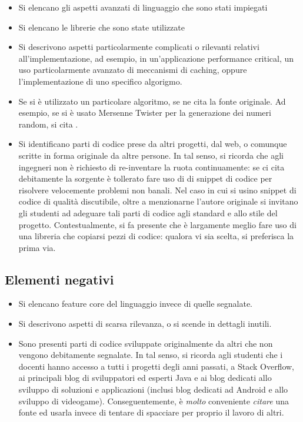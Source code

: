\documentclass[a4paper,12pt]{report}
\begin{document}
\begin{itemize}
	\item Si elencano gli aspetti avanzati di linguaggio che sono stati impiegati
	\item Si elencano le librerie che sono state utilizzate
	\item Si descrivono aspetti particolarmente complicati o rilevanti relativi all'implementazione, ad esempio, in un'applicazione performance critical, un uso particolarmente avanzato di meccanismi di caching, oppure l'implementazione di uno specifico algorigmo.
	\item Se si è utilizzato un particolare algoritmo, se ne cita la fonte originale. Ad esempio, se si è usato Mersenne Twister per la generazione dei numeri random, si cita \cite{mersenne}.
	\item Si identificano parti di codice prese da altri progetti, dal web, o comunque scritte in forma originale da altre persone. In tal senso, si ricorda che agli ingegneri non è richiesto di re-inventare la ruota continuamente: se ci cita debitamente la sorgente è tollerato fare uso di di snippet di codice per risolvere velocemente problemi non banali. Nel caso in cui si usino snippet di codice di qualità discutibile, oltre a menzionarne l'autore originale si invitano gli studenti ad adeguare tali parti di codice agli standard e allo stile del progetto. Contestualmente, si fa presente che è largamente meglio fare uso di una libreria che copiarsi pezzi di codice: qualora vi sia scelta, si preferisca la prima via.
\end{itemize}

\subsection*{Elementi negativi}
\begin{itemize}
	\item Si elencano feature core del linguaggio invece di quelle segnalate.
	\item Si descrivono aspetti di scarsa rilevanza, o si scende in dettagli inutili.
	\item Sono presenti parti di codice sviluppate originalmente da altri che non vengono debitamente segnalate. In tal senso, si ricorda agli studenti che i docenti hanno accesso a tutti i progetti degli anni passati, a Stack Overflow, ai principali blog di sviluppatori ed esperti Java e ai blog dedicati allo sviluppo di soluzioni e applicazioni (inclusi blog dedicati ad Android e allo sviluppo di videogame). Conseguentemente, è \emph{molto} conveniente \emph{citare} una fonte ed usarla invece di tentare di spacciare per proprio il lavoro di altri.
\end{itemize}
\end{document}
